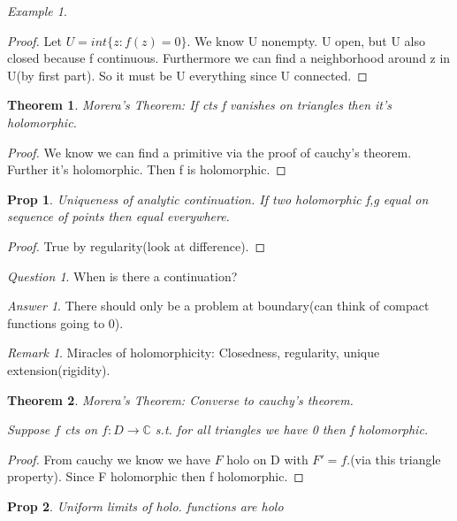 \documentclass[11pt]{article}
\newcommand{\C}{\mathbb{C}}
\newtheorem{theorem}{Theorem}
\newtheorem{prop}{Prop}
\theoremstyle{remark}
\newtheorem{remark}{Remark}
\newtheorem{quest}{Question}
\newtheorem{ans}{Answer}
\newtheorem{example}{Example}
\begin{document}
\begin{example}
\begin{proof}
	Let $U = int\{z: f(z) = 0\}$. We know U nonempty. U open, but U also closed because f continuous. Furthermore we can find a neighborhood around z in U(by first part). So it must be U everything since U connected. 
\end{proof}

\begin{theorem}
	Morera's Theorem:
	If cts f vanishes on triangles then it's holomorphic. 
\end{theorem}

\begin{proof}
	We know we can find a primitive via the proof of cauchy's theorem. Further it's holomorphic. Then f is holomorphic. 
\end{proof}

\begin{prop}
	Uniqueness of analytic continuation. If two holomorphic f,g equal on sequence of points then equal everywhere.
\end{prop}

\begin{proof}
	True by regularity(look at difference). 
\end{proof}

\begin{quest}
	When is there a continuation?
\end{quest}

\begin{ans}
	There should only be a problem at boundary(can think of compact functions going to 0).
\end{ans}

\begin{remark}
	Miracles of holomorphicity: Closedness, regularity, unique extension(rigidity).
\end{remark}

\begin{theorem}
	Morera's Theorem: Converse to cauchy's theorem.

	Suppose $f$ cts on $f : D \to \C$ s.t. for all triangles we have 0 then f holomorphic.
\end{theorem}

\begin{proof}
	From cauchy we know we have $F$ holo on D with $F' = f$.(via this triangle property). Since F holomorphic then f holomorphic. 
\end{proof}

\begin{prop}
	Uniform limits of holo. functions are holo
\end{prop}


\end{example}
\end{document}
